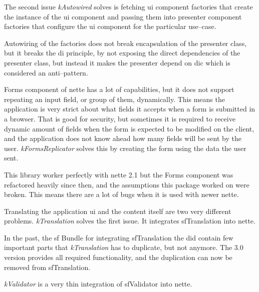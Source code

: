 The second issue \textit{\gls{kAutowired}} solves is fetching \gls{ui} component factories that create the instance of the \gls{ui} component and passing them into presenter component factories that configure the \gls{ui} component for the particular use--case.

Autowiring of the factories does not break encapsulation of the presenter class, but it breaks the \gls{di} principle, by not exposing the direct dependencies of the presenter class, but instead it makes the presenter depend on \gls{dic} which is considered an anti--pattern.

 \label{sec:state:forms-replicator}

Forms component of \gls{nette} has a lot of capabilities, but it does not support repeating an input field, or group of them, dynamically. This means the application is very strict about what fields it accepts when a form is submitted in a browser. That is good for security, but sometimes it is required to receive dynamic amount of fields when the form is expected to be modified on the client, and the application does not know ahead how many fields will be sent by the user. \textit{\gls{kFormsReplicator}} solves this by creating the form using the data the user sent.

This library worker perfectly with \gls{nette} 2.1 but the Forms component was refactored heavily since then, and the assumptions this package worked on were broken. This means there are a lot of bugs when it is used with newer \gls{nette}.

 \label{sec:state:translation}

Translating the application \gls{ui} and the content itself are two very different problems. \textit{\gls{kTranslation}} solves the first issue. It integrates \gls{sfTranslation} into \gls{nette}.

In the past, the \gls{sf} Bundle for integrating \gls{sfTranslation} the did contain few important parts that \textit{\gls{kTranslation}} has to duplicate, but not anymore. The 3.0 version provides all required functionality, and the duplication can now be removed from \gls{sfTranslation}.

 \label{sec:state:validator}

\textit{\gls{kValidator}} is a very thin integration of \gls{sfValidator} into \gls{nette}.

 \label{sec:state:rabbit-mq}

